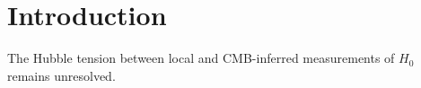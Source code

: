 \section{Introduction}

The Hubble tension between local and CMB-inferred measurements of $H_0$ remains unresolved.
